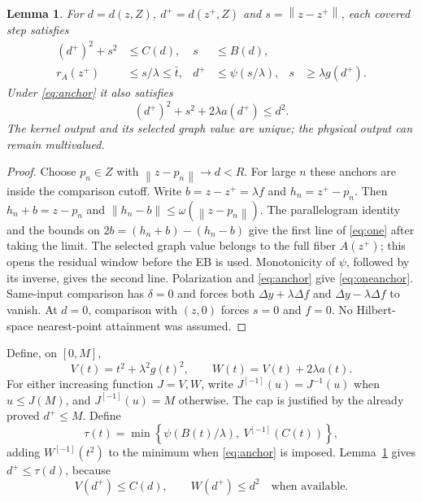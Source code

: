 \documentclass[11pt]{article}
\newcommand{\norm}[1]{\left\lVert#1\right\rVert}
\newtheorem{lemma}[theorem]{Lemma}
\theoremstyle{remark}
\begin{document}
\begin{lemma}\label{lem:one}
For $d=d(z,Z)$, $d^+=d(z^+,Z)$ and $s=\norm{z-z^+}$, each covered step
satisfies
\begin{align}\label{eq:one}
 (d^+)^2+s^2&\le C(d),&s&\le B(d),\\
 r_A(z^+)&\le s/\lambda\le\bar t,&
 d^+&\le\psi(s/\lambda),&s&\ge\lambda g(d^+).\nonumber
\end{align}
Under \eqref{eq:anchor} it also satisfies
\begin{equation}\label{eq:oneanchor}
 (d^+)^2+s^2+2\lambda a(d^+)\le d^2.
\end{equation}
The kernel output and its selected graph value are unique; the physical
output can remain multivalued.
\end{lemma}
\begin{proof}
Choose $p_n\in Z$ with $\norm{z-p_n}\to d<R$. For large $n$ these
anchors are inside the comparison cutoff. Write $b=z-z^+=\lambda f$
and $h_n=z^+-p_n$. Then $h_n+b=z-p_n$ and
$\norm{h_n-b}\le\omega(\norm{z-p_n})$. The parallelogram identity and
the bounds on $2b=(h_n+b)-(h_n-b)$ give the first line of
\eqref{eq:one} after taking the limit. The selected graph value belongs
to the full fiber $A(z^+)$; this opens the residual window before the EB
is used. Monotonicity of $\psi$, followed by its inverse, gives the
second line. Polarization and \eqref{eq:anchor} give
\eqref{eq:oneanchor}. Same-input comparison has $\delta=0$ and forces
both $\Delta y+\lambda\Delta f$ and $\Delta y-\lambda\Delta f$ to
vanish. At $d=0$, comparison with $(z,0)$ forces $s=0$ and $f=0$.
No Hilbert-space nearest-point attainment was assumed.
\end{proof}

Define, on $[0,M]$,
\begin{equation}
 V(t)=t^2+\lambda^2g(t)^2,\qquad
 W(t)=V(t)+2\lambda a(t).
\end{equation}
For either increasing function $J=V,W$, write $J^{[-1]}(u)=J^{-1}(u)$
when $u\le J(M)$, and $J^{[-1]}(u)=M$ otherwise. The cap is justified
by the already proved $d^+\le M$. Define
\begin{equation}\label{eq:tau}
 \tau(t)=\min\left\{\psi(B(t)/\lambda),\ V^{[-1]}(C(t))\right\},
\end{equation}
adding $W^{[-1]}(t^2)$ to the minimum when \eqref{eq:anchor} is imposed.
Lemma~\ref{lem:one} gives $d^+\le\tau(d)$, because
\begin{equation}\label{eq:energy}
 V(d^+)\le C(d),\qquad W(d^+)\le d^2\quad\text{when available}.
\end{equation}
\end{document}
